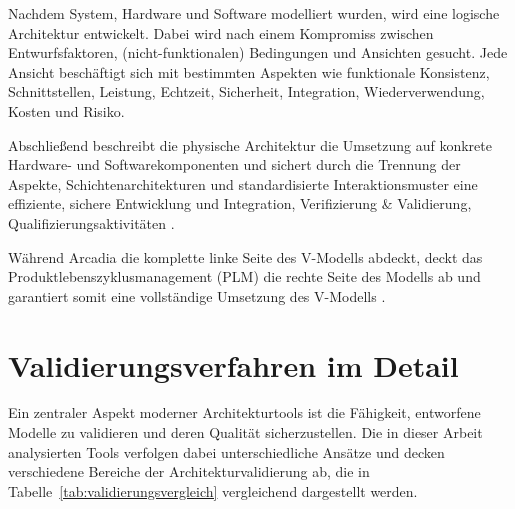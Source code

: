 Nachdem System, Hardware und Software modelliert wurden, wird eine logische Architektur entwickelt. Dabei wird nach einem Kompromiss zwischen Entwurfsfaktoren, (nicht-funktionalen) Bedingungen und Ansichten gesucht. Jede Ansicht beschäftigt sich mit bestimmten Aspekten wie funktionale Konsistenz, Schnittstellen, Leistung, Echtzeit, Sicherheit, Integration, Wiederverwendung, Kosten und Risiko.

Abschließend beschreibt die physische Architektur die Umsetzung auf konkrete Hardware- und Softwarekomponenten und sichert durch die Trennung der Aspekte, Schichtenarchitekturen und standardisierte Interaktionsmuster eine effiziente, sichere Entwicklung und Integration, Verifizierung \& Validierung, Qualifizierungsaktivitäten \cite{let24}.

Während Arcadia die komplette linke Seite des V-Modells abdeckt, deckt das Produktlebenszyklusmanagement (PLM) die rechte Seite des Modells ab und garantiert somit eine vollständige Umsetzung des V-Modells \cite{2024arcadia}.

\section{Validierungsverfahren im Detail}

Ein zentraler Aspekt moderner Architekturtools ist die Fähigkeit, entworfene Modelle zu validieren und deren Qualität sicherzustellen. Die in dieser Arbeit analysierten Tools verfolgen dabei unterschiedliche Ansätze und decken verschiedene Bereiche der Architekturvalidierung ab, die in Tabelle~\ref{tab:validierungsvergleich} vergleichend dargestellt werden.

